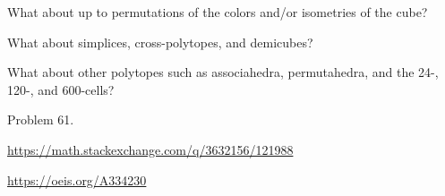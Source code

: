 \documentclass{article}
\begin{document}
\begin{related}
  \item What about up to permutations of the colors and/or isometries of the cube?
  \item What about simplices, cross-polytopes, and demicubes?
  \item What about other polytopes such as associahedra, permutahedra, and
    the 24-, 120-, and 600-cells?
\end{related}

\begin{references}
  \item Problem 61.
  \item \url{https://math.stackexchange.com/q/3632156/121988}
  \item \url{https://oeis.org/A334230}
\end{references}
\end{document}

